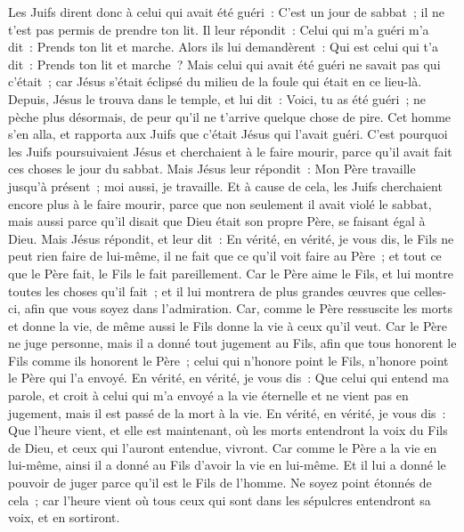 \begin{multicols}{2}
Les Juifs dirent donc à celui qui avait été guéri~: C'est un jour de sabbat~; il ne t'est pas permis de prendre ton lit.
Il leur répondit~: Celui qui m'a guéri m'a dit~: Prends ton lit et marche.
Alors ils lui demandèrent~: Qui est celui qui t'a dit~: Prends ton lit et marche~?
Mais celui qui avait été guéri ne savait pas qui c'était~; car Jésus s'était éclipsé du milieu de la foule qui était en ce lieu-là.
Depuis, Jésus le trouva dans le temple, et lui dit~: Voici, tu as été guéri~; ne pèche plus désormais, de peur qu'il ne t'arrive quelque chose de pire.
Cet homme s'en alla, et rapporta aux Juifs que c'était Jésus qui l'avait guéri.
C'est pourquoi les Juifs poursuivaient Jésus et cherchaient à le faire mourir, parce qu'il avait fait ces choses le jour du sabbat.
Mais Jésus leur répondit~: Mon Père travaille jusqu'à présent~; moi aussi, je travaille.
Et à cause de cela, les Juifs cherchaient encore plus à le faire mourir, parce que non seulement il avait violé le sabbat, mais aussi parce qu'il disait que Dieu était son propre Père, se faisant égal à Dieu.
Mais Jésus répondit, et leur dit~: En vérité, en vérité, je vous dis, le Fils ne peut rien faire de lui-même, il ne fait que ce qu'il voit faire au Père~; et tout ce que le Père fait, le Fils le fait pareillement.
Car le Père aime le Fils, et lui montre toutes les choses qu'il fait~; et il lui montrera de plus grandes œuvres que celles-ci, afin que vous soyez dans l'admiration.
Car, comme le Père ressuscite les morts et donne la vie, de même aussi le Fils donne la vie à ceux qu'il veut.
Car le Père ne juge personne, mais il a donné tout jugement au Fils,
afin que tous honorent le Fils comme ils honorent le Père~; celui qui n'honore point le Fils, n'honore point le Père qui l'a envoyé.
En vérité, en vérité, je vous dis~: Que celui qui entend ma parole, et croit à celui qui m'a envoyé a la vie éternelle et ne vient pas en jugement, mais il est passé de la mort à la vie.
En vérité, en vérité, je vous dis~: Que l'heure vient, et elle est maintenant, où les morts entendront la voix du Fils de Dieu, et ceux qui l'auront entendue, vivront.
Car comme le Père a la vie en lui-même, ainsi il a donné au Fils d'avoir la vie en lui-même.
Et il lui a donné le pouvoir de juger parce qu'il est le Fils de l'homme.
Ne soyez point étonnés de cela~; car l'heure vient où tous ceux qui sont dans les sépulcres entendront sa voix, et en sortiront.

\end{multicols}

